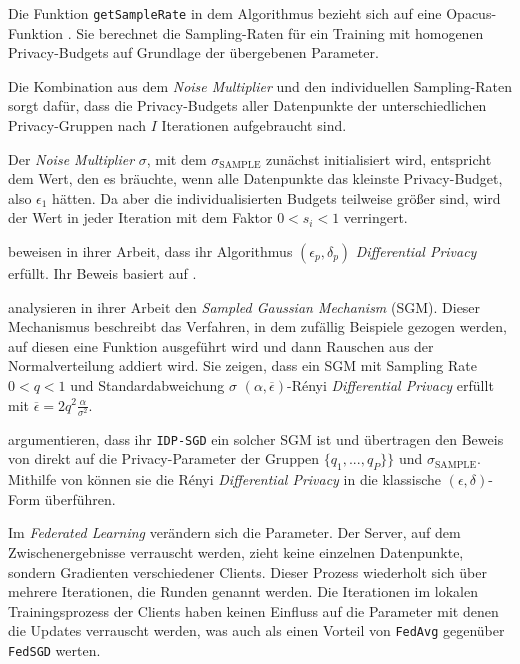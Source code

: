 Die Funktion \texttt{getSampleRate} in dem Algorithmus bezieht sich auf eine Opacus-Funktion \cite{yousefpour:2021}. Sie berechnet die Sampling-Raten für ein Training mit homogenen Privacy-Budgets auf Grundlage der übergebenen Parameter.

Die Kombination aus dem \textit{Noise Multiplier} und den individuellen Sampling-Raten sorgt dafür, dass die Privacy-Budgets aller Datenpunkte der unterschiedlichen Privacy-Gruppen nach $I$ Iterationen aufgebraucht sind. 

Der \textit{Noise Multiplier} $\sigma$, mit dem $\sigma_{\text{SAMPLE}}$ zunächst initialisiert wird, entspricht dem Wert, den es bräuchte, wenn alle Datenpunkte das kleinste Privacy-Budget, also $\epsilon_1$ hätten. Da aber die individualisierten Budgets teilweise größer sind, wird der Wert in jeder Iteration mit dem Faktor $0 < s_i < 1$ verringert.

\textcite[p.26f.]{boenisch:2023} beweisen in ihrer Arbeit, dass ihr Algorithmus $(\epsilon_p, \delta_p)$ \textit{Differential Privacy} erfüllt. Ihr Beweis basiert auf \textcite{mironov:2017, mironov:2019}. 

\textcite{mironov:2019} analysieren in ihrer Arbeit den \textit{Sampled Gaussian Mechanism} (SGM). Dieser Mechanismus beschreibt das Verfahren, in dem zufällig Beispiele gezogen werden, auf diesen eine Funktion ausgeführt wird und dann Rauschen aus der Normalverteilung addiert wird. Sie zeigen, dass ein SGM mit Sampling Rate $0 < q < 1$ und Standardabweichung $\sigma$ $(\alpha, \overline{\epsilon})$-Rényi \textit{Differential Privacy} erfüllt mit $\overline{\epsilon} = 2q^2 \frac{\alpha}{\sigma^2}$.

\citeauthor{boenisch:2023} argumentieren, dass ihr \texttt{IDP-SGD} ein solcher SGM ist und übertragen den Beweis von \citeauthor{mironov:2019} direkt auf die Privacy-Parameter der Gruppen $\{q_1, ..., q_P\}\}$ und $\sigma_{\text{SAMPLE}}$. Mithilfe von \textcite{mironov:2017} können sie die Rényi \textit{Differential Privacy} in die klassische $(\epsilon, \delta)$-Form überführen.

Im \textit{Federated Learning} verändern sich die Parameter. Der Server, auf dem Zwischenergebnisse verrauscht werden, zieht keine einzelnen Datenpunkte, sondern Gradienten verschiedener Clients. Dieser Prozess wiederholt sich über mehrere Iterationen, die Runden genannt werden. Die Iterationen im lokalen Trainingsprozess der Clients haben keinen Einfluss auf die Parameter mit denen die Updates verrauscht werden, was auch \textcite[p.3]{mcmahan:2018} als einen Vorteil von \texttt{FedAvg} gegenüber \texttt{FedSGD} werten. 

